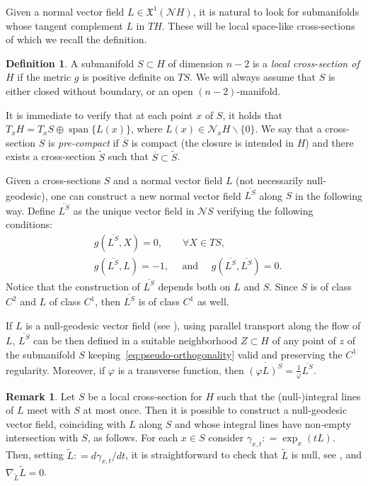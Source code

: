 \documentclass[12pt,a4paper]{amsart}
\theoremstyle{plain}
\theoremstyle{definition}
\newtheorem{definition}[lemma]{Definition}
\newtheorem{remark}[lemma]{Remark}
\numberwithin{equation}{section}
\let\phi\varphi
\DeclareMathOperator{\Span}{span}
\newcommand{\vfield}{\mathfrak{X}}
\newcommand{\normal}{\mathscr{N}}
\begin{document}
Given a normal vector field $L\in \vfield^1(\normal H)$, it is natural to look for submanifolds whose tangent complement $L$ in $TH$.  
These will be local space-like cross-sections of which we recall the definition.
%
\begin{definition}
A submanifold $S\subset H$ of dimension $n-2$ is 
a \emph{local cross-section of} $H$  if the metric $g$ is positive definite on $TS$.  We will always assume that $S$ is either closed without boundary, or an open $(n-2)$-manifold.
\end{definition}
%
It is immediate to verify that at each point $x$ of $S$, it holds that 
$T_xH = T_x S \oplus \Span \{L(x)\}$, where $L(x)\in \normal_x H\backslash \{0\}$.
We say that a cross-section $S$ is \emph{pre-compact} if $\overline
S$ is compact (the closure is intended in $H$) and there exists a cross-section $\tilde S$
such that $\overline{S}\subset \tilde S$.

\smallskip

Given a cross-sections $S$ and a normal vector field $L$ (not necessarily null-geodesic), one can construct a new normal vector field
$\overline{L^S}$  along  $S$ in the following way. 
Define
$\overline{L^S}$  as the unique vector field in $\normal S$ verifying the following conditions:
%
\begin{align}\label{eq:normalS}
  &
  g(\overline{L^S}, X)=0,
  \qquad
  \forall X\in TS
  ,
  \\&
  \label{eq:pseudo-orthogonality}
  g(\overline{L^S}, L)=-1
  ,
  \quad
  \text{ and }
  \quad
  g(\overline{L^S},\overline{L^S})
  =0.
\end{align}
%
Notice that the construction of $\overline{L^S}$ depends both on $L$ and $S$.
Since $S$ is of class $C^{2}$ and $L$ of class $C^{1}$, then $\overline{L^S}$ is of class $C^{1}$ as well. 
%

If $L$ is a null-geodesic vector field (see ),  using parallel transport along the flow of $L$, 
$\overline{L^S}$ can be then defined in a suitable neighborhood  $Z \subset H$ of any point of $z$ of the submanifold $S$ keeping~\eqref{eq:pseudo-orthogonality} valid and preserving the  $C^{1}$ regularity. 
% 
Moreover, if $\phi$ is a transverse function, then $\overline{(\phi
  L)^S}=\frac{1}{\phi} \overline{L^S}$.
%


\begin{remark} \label{rmrk:global-null-geodesics}
Let $S$ be a local cross-section for $H$ such that the (null-)integral lines of $L$ meet with $S$ at most once.   Then it is possible to construct a null-geodesic vector field, coinciding with $L$ along $S$ and whose integral lines have non-empty intersection with $S$, as follows. 
For each $x \in S$ consider 
$\gamma_{x,t} : = \exp_x(tL)$. Then, setting $\tilde L: = d\gamma_{x,t}/dt$, it is straightforward to check that $\tilde L$ is null, see , and $\nabla_{\tilde L}\tilde L =0$.
\end{remark}
\end{document}
